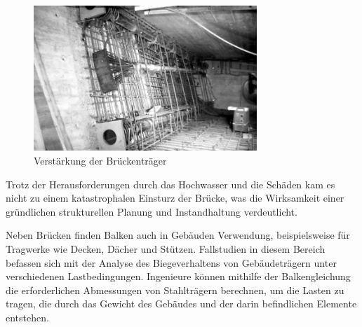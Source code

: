 \begin{figure}
\begin{center}
\includegraphics[width=0.75\textwidth]{papers/balken/images/teil3/ReussbrueckeWassen3.jpg}
\end{center}
\caption{Verstärkung der Brückenträger}
\end{figure}
Trotz der Herausforderungen durch das Hochwasser und die Schäden kam es nicht zu einem katastrophalen Einsturz der Brücke, was die Wirksamkeit einer gründlichen strukturellen Planung und Instandhaltung verdeutlicht.

Neben Brücken finden Balken auch in Gebäuden Verwendung, beispielsweise für Tragwerke wie Decken, Dächer und Stützen.
Fallstudien in diesem Bereich befassen sich mit der Analyse des Biegeverhaltens von Gebäudeträgern unter verschiedenen Lastbedingungen. Ingenieure können mithilfe der Balkengleichung die erforderlichen Abmessungen von Stahlträgern berechnen, um die Lasten zu tragen, die durch das Gewicht des Gebäudes und der darin befindlichen Elemente entstehen.

